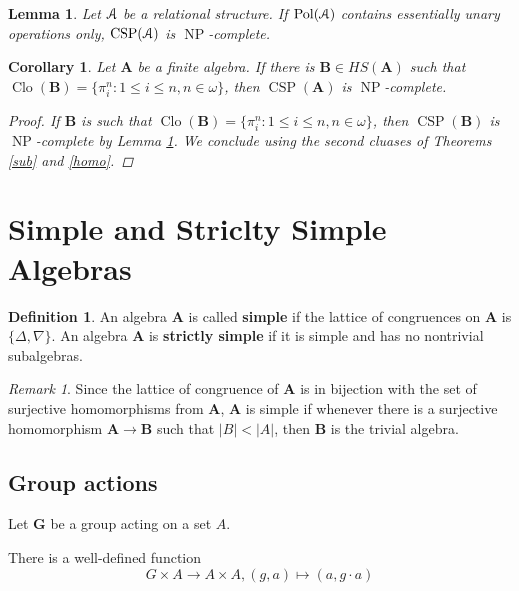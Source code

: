 \documentclass{amsart}
\theoremstyle{plain}
\newtheorem{corollary}[theorem]{Corollary}
\newtheorem{lemma}[theorem]{Lemma}
\theoremstyle{definition}
\newtheorem{definition}[theorem]{Definition}
\theoremstyle{remark}
\newtheorem{remark}[theorem]{Remark}
\DeclareMathOperator{\Clo}{Clo}
\DeclareMathOperator{\CSP}{CSP}
\DeclareMathOperator{\Pol}{Pol}
\DeclareMathOperator{\NP}{NP}
\begin{document}
\begin{lemma}
    \label{ess-unary}
    Let $\EuScript{A}$ be a relational structure. 
    If $\Pol(\EuScript{A})$ contains essentially unary operations only, $\CSP(\EuScript{A})$ is $\NP$-complete. 
\end{lemma}

\begin{corollary}
    Let $\mathbf{A}$ be a finite 
    algebra. 
    If there is $\mathbf{B} \in HS(\mathbf{A})$ such that $\Clo(\mathbf{B}) = \{\pi^n_i: 1 \le i \le n, n \in \omega\}$, then 
    $\CSP(\mathbf{A})$ is $\NP$-complete. 
    \begin{proof}
        If $\mathbf{B}$ is such that $\Clo(\mathbf{B}) = \{\pi^n_i: 1 \le i \le n, n \in \omega\}$, then $\CSP(\mathbf{B})$ is $\NP$-complete by Lemma \ref{ess-unary}. 
        We conclude using the second cluases of Theorems \ref{sub} and \ref{homo}. 
   \end{proof}
\end{corollary}

\section{Simple and Striclty Simple Algebras}
\begin{definition}
    An algebra $\mathbf{A}$ is called \textbf{simple} if the lattice of congruences on $\mathbf{A}$ is $\{\Delta, \nabla \}$. 
    An algebra $\mathbf{A}$ is \textbf{strictly simple} if it is simple and has no nontrivial subalgebras. 
\end{definition}

\begin{remark}
    Since the lattice of congruence of $\mathbf{A}$ is in bijection with the set of surjective homomorphisms from $\mathbf{A}$, 
    $\mathbf{A}$ is simple if whenever there is a surjective homomorphism $\mathbf{A} \to \mathbf{B}$ such that $|B| < |A|$, then $\mathbf{B}$ is the trivial algebra. 
\end{remark}

\subsection{Group actions}
Let $\mathbf{G}$ be a group acting on a set $A$.  

There is a well-defined function
\begin{equation*}
    G \times A \to A \times A, (g,a) \mapsto (a, g \cdot a)
\end{equation*} 
\end{document}
